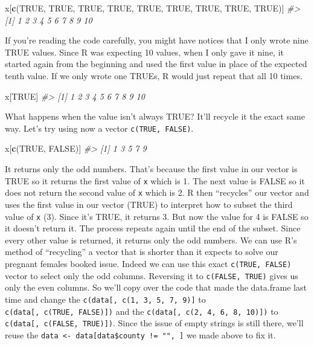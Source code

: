 \documentclass[
  12pt,
]{book}
\newenvironment{Shaded}{\begin{snugshade}}{\end{snugshade}}
\newcommand{\CommentTok}[1]{\textcolor[rgb]{0.37,0.37,0.37}{\textit{#1}}}
\newcommand{\KeywordTok}[1]{\textcolor[rgb]{0.27,0.27,0.27}{\textbf{#1}}}
\newcommand{\NormalTok}[1]{#1}
\newcommand{\OtherTok}[1]{\textcolor[rgb]{0.37,0.37,0.37}{#1}}
\begin{document}
\begin{Shaded}
\begin{Highlighting}[]
\NormalTok{x[}\KeywordTok{c}\NormalTok{(}\OtherTok{TRUE}\NormalTok{, }\OtherTok{TRUE}\NormalTok{, }\OtherTok{TRUE}\NormalTok{, }\OtherTok{TRUE}\NormalTok{, }\OtherTok{TRUE}\NormalTok{, }\OtherTok{TRUE}\NormalTok{, }\OtherTok{TRUE}\NormalTok{, }\OtherTok{TRUE}\NormalTok{, }\OtherTok{TRUE}\NormalTok{)]}
\CommentTok{\#>  [1]  1  2  3  4  5  6  7  8  9 10}
\end{Highlighting}
\end{Shaded}

If you're reading the code carefully, you might have notices that I only wrote nine TRUE values. Since R was expecting 10 values, when I only gave it nine, it started again from the beginning and used the first value in place of the expected tenth value. If we only wrote one TRUEs, R would just repeat that all 10 times.

\begin{Shaded}
\begin{Highlighting}[]
\NormalTok{x[}\OtherTok{TRUE}\NormalTok{]}
\CommentTok{\#>  [1]  1  2  3  4  5  6  7  8  9 10}
\end{Highlighting}
\end{Shaded}

What happens when the value isn't always TRUE? It'll recycle it the exact same way. Let's try using now a vector \texttt{c(TRUE,\ FALSE)}.

\begin{Shaded}
\begin{Highlighting}[]
\NormalTok{x[}\KeywordTok{c}\NormalTok{(}\OtherTok{TRUE}\NormalTok{, }\OtherTok{FALSE}\NormalTok{)]}
\CommentTok{\#> [1] 1 3 5 7 9}
\end{Highlighting}
\end{Shaded}

It returns only the odd numbers. That's because the first value in our vector is TRUE so it returns the first value of \texttt{x} which is 1. The next value is FALSE so it does not return the second value of \texttt{x} which is 2. R then ``recycles'' our vector and uses the first value in our vector (TRUE) to interpret how to subset the third value of \texttt{x} (3). Since it's TRUE, it returns 3. But now the value for 4 is FALSE so it doesn't return it. The process repeats again until the end of the subset. Since every other value is returned, it returns only the odd numbers. We can use R's method of ``recycling'' a vector that is shorter than it expects to solve our pregnant females booked issue. Indeed we can use this exact \texttt{c(TRUE,\ FALSE)} vector to select only the odd columns. Reversing it to \texttt{c(FALSE,\ TRUE)} gives us only the even columns. So we'll copy over the code that made the data.frame last time and change the \texttt{c(data{[},\ c(1,\ 3,\ 5,\ 7,\ 9){]}} to \texttt{c(data{[},\ c(TRUE,\ FALSE){]})} and the \texttt{c(data{[},\ c(2,\ 4,\ 6,\ 8,\ 10){]})} to \texttt{c(data{[},\ c(FALSE,\ TRUE){]})}. Since the issue of empty strings is still there, we'll reuse the \texttt{data\ \textless{}-\ data{[}data\$county\ !=\ "",\ {]}} we made above to fix it.
\end{document}
